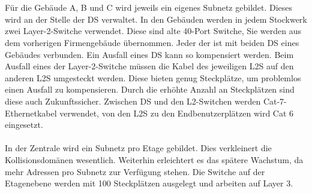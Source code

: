 \documentclass[a4paper,11pt]{article}
\begin{document}
\\
\\
Für die Gebäude A, B und C wird jeweils ein eigenes Subnetz gebildet. Dieses wird an der Stelle der DS verwaltet. In den Gebäuden werden in jedem Stockwerk zwei Layer-2-Switche verwendet. Diese sind alte 40-Port Switche, Sie werden aus dem vorherigen Firmengebäude übernommen. Jeder der ist mit beiden DS eines Gebäudes verbunden. Ein Ausfall eines DS kann so kompensiert werden. Beim Ausfall eines der Layer-2-Switche müssen die Kabel des jeweiligen L2S auf den anderen L2S umgesteckt werden. Diese bieten genug Steckplätze, um problemlos einen Ausfall zu kompensieren. Durch die erhöhte Anzahl an Steckplätzen sind diese auch Zukunftssicher.
Zwischen DS und den L2-Switchen werden Cat-7-Ethernetkabel verwendet, von den L2S zu den Endbenutzerplätzen wird Cat 6 eingesetzt.
\\
\\
In der Zentrale wird ein Subnetz pro Etage gebildet. Dies verkleinert die Kollisionsdomänen wesentlich. Weiterhin erleichtert es das spätere Wachstum, da mehr Adressen pro Subnetz zur Verfügung stehen. Die Switche auf der Etagenebene werden mit 100 Steckplätzen ausgelegt und arbeiten auf Layer 3.
\end{document}
